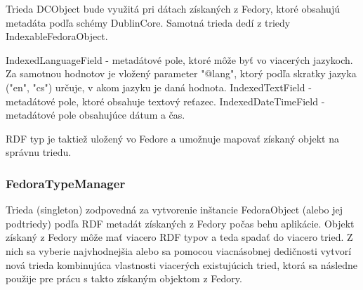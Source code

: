\documentclass[thesis=M,slovak]{FITthesis}[2013/05/06]
\begin{document}
Trieda DCObject bude využitá pri dátach získaných z Fedory, ktoré obsahujú metadáta podľa schémy DublinCore. Samotná trieda dedí z triedy IndexableFedoraObject.

IndexedLanguageField - metadátové pole, ktoré môže byť vo viacerých jazykoch. Za samotnou hodnotov je vložený parameter "@lang", ktorý podľa skratky jazyka ("en", "cs") určuje, v akom jazyku je daná hodnota.
IndexedTextField - metadátové pole, ktoré obsahuje textový reťazec.
IndexedDateTimeField - metadátové pole obsahujúce dátum a čas.

RDF typ je taktiež uložený vo Fedore a umožnuje mapovať získaný objekt na správnu triedu.

\subsubsection{FedoraTypeManager}
Trieda (singleton) zodpovedná za vytvorenie inštancie FedoraObject (alebo jej podtriedy) podľa RDF metadát získaných z Fedory počas behu aplikácie. Objekt získaný z Fedory môže mať viacero RDF typov a teda spadať do viacero tried. Z nich sa vyberie najvhodnejšia alebo sa pomocou viacnásobnej dedičnosti vytvorí nová trieda kombinujúca vlastnosti viacerých existujúcich tried,  ktorá sa následne použije pre prácu s takto získaným objektom z Fedory.
\end{document}
